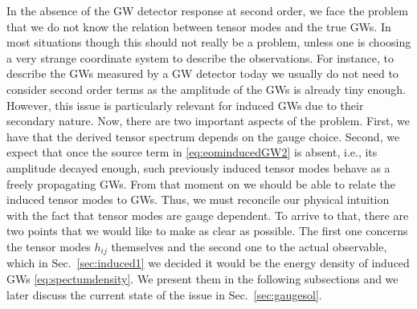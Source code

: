 \documentclass[a4paper,11pt]{article}
\numberwithin{equation}{section}
\begin{document}
In the absence of the GW detector response at second order, we face the problem that we do not know the relation between tensor modes and the true GWs. In most situations though this should not really be a problem, unless one is choosing a very strange coordinate system to describe the observations. For instance, to describe the GWs measured by a GW detector today we usually do not need to consider second order terms as the amplitude of the GWs is already tiny enough. However, this issue is particularly relevant for induced GWs due to their secondary nature. Now, there are two important aspects of the problem. First, we have that the derived tensor spectrum depends on the gauge choice. Second, we expect that once the source term in \eqref{eq:eominducedGW2} is absent, i.e., its amplitude decayed enough, such previously induced tensor modes behave as a freely propagating GWs. From that moment on we should be able to relate the induced tensor modes to GWs. Thus, we must reconcile our physical intuition with the fact that tensor modes are gauge dependent. To arrive to that, there are two points that we would like to make as clear as possible. The first one concerns the tensor modes $h_{ij}$ themselves and the second one to the actual observable, which in Sec.~\ref{sec:induced1} we decided it would be the energy density of induced GWs \eqref{eq:spectumdensity}. We present them in the following subsections and we later discuss the current state of the issue in Sec.~\ref{sec:gaugesol}.
\end{document}
